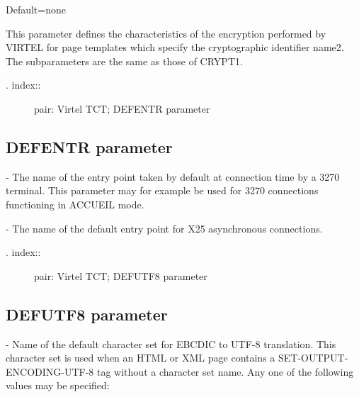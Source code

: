 \documentclass[letterpaper,10pt,english]{sphinxmanual}
\begin{document}
Default=none

This parameter defines the characteristics of the encryption performed by VIRTEL for page templates which specify the cryptographic identifier name2. The subparameters are the same as those of CRYPT1.
\begin{description}
\item[{. index::}] \leavevmode
pair: Virtel TCT; DEFENTR parameter

\end{description}


\subsection{DEFENTR parameter}
\label{\detokenize{Installation_Guide:defentr-parameter}}
\begin{sphinxVerbatim}[commandchars=\\\{\}]
 
\end{sphinxVerbatim}

 - The name of the entry point taken by default at connection time by a 3270 terminal. This parameter may for example be used for 3270 connections functioning in ACCUEIL mode.

 - The name of the default entry point for X25 asynchronous connections.
\begin{description}
\item[{. index::}] \leavevmode
pair: Virtel TCT; DEFUTF8 parameter

\end{description}


\subsection{DEFUTF8 parameter}
\label{\detokenize{Installation_Guide:defutf8-parameter}}
\begin{sphinxVerbatim}[commandchars=\\\{\}]
 
\end{sphinxVerbatim}

 - Name of the default character set for EBCDIC to UTF-8 translation. This character set is used when an HTML or XML page contains a SET-OUTPUT-ENCODING-UTF-8 tag without a character set name. Any one of the following values may be specified:
\end{document}
